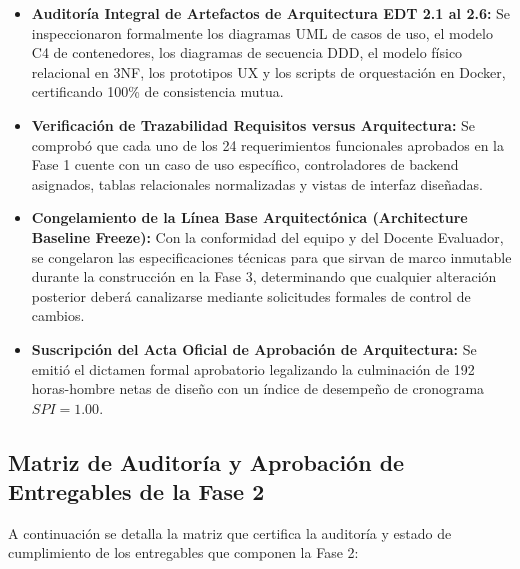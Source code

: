 \documentclass[12pt,a4paper]{article}
\begin{document}
\begin{itemize}[leftmargin=1.5em, itemsep=4pt]
    \item \textbf{Auditoría Integral de Artefactos de Arquitectura EDT 2.1 al 2.6:} Se inspeccionaron formalmente los diagramas UML de casos de uso, el modelo C4 de contenedores, los diagramas de secuencia DDD, el modelo físico relacional en 3NF, los prototipos UX y los scripts de orquestación en Docker, certificando 100\% de consistencia mutua.
    \item \textbf{Verificación de Trazabilidad Requisitos versus Arquitectura:} Se comprobó que cada uno de los 24 requerimientos funcionales aprobados en la Fase 1 cuente con un caso de uso específico, controladores de backend asignados, tablas relacionales normalizadas y vistas de interfaz diseñadas.
    \item \textbf{Congelamiento de la Línea Base Arquitectónica (Architecture Baseline Freeze):} Con la conformidad del equipo y del Docente Evaluador, se congelaron las especificaciones técnicas para que sirvan de marco inmutable durante la construcción en la Fase 3, determinando que cualquier alteración posterior deberá canalizarse mediante solicitudes formales de control de cambios.
    \item \textbf{Suscripción del Acta Oficial de Aprobación de Arquitectura:} Se emitió el dictamen formal aprobatorio legalizando la culminación de 192 horas-hombre netas de diseño con un índice de desempeño de cronograma $SPI = 1.00$.
\end{itemize}

\subsection{Matriz de Auditoría y Aprobación de Entregables de la Fase 2}
A continuación se detalla la matriz que certifica la auditoría y estado de cumplimiento de los entregables que componen la Fase 2:
\end{document}
